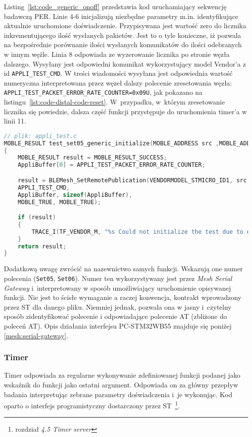 Listing~\ref{lst:code_generic_onoff} przedstawia kod uruchamiający sekwencję badawczą PER. Linie 4-6 inicjalizują niezbędne
parametry m.in. identyfikujące aktualnie uruchomione doświadczenie. Przypisywana jest wartość zero do licznika inkrementującego
ilość wysłanych pakietów. Jest to o tyle  konieczne, iż pozwala na bezpośrednie porównanie ilości wysłanych komunikatów do
ilości odebranych w innym węźle. Linia 8 odpowiada ze wyzerowanie licznika po stronie węzła dalszego. Wysyłany jest odpowiedni
komunikat wykorzystujący model Vendor'a z id \texttt{APPLI\_TEST\_CMD}. W treści wiadomości wysyłana jest odpowiednia wartość numeryczna
interpretowana przez węzeł dalszy polecenie zresetowania węzła: \texttt{APPLI\_TEST\_PACKET\_ERROR\_RATE\_COUNTER=0x09U}, jak
pokazano na listingu~\ref{lst:code-distal-code-reset}.
W~przypadku, w~którym zresetowanie licznika się powiedzie, dalsza część funkcji przystępuje do uruchomienia timer'a
w linii 11.

\begin{lstlisting}[language=C,
    caption={Kod resetujący wartość licznika w węźle dystalnym},
    label={lst:code-distal-code-reset}]
// plik: appli_test.c
MOBLE_RESULT test_set05_generic_initialize(MOBLE_ADDRESS src ,MOBLE_ADDRESS dst)
{
	MOBLE_RESULT result = MOBLE_RESULT_SUCCESS;
	AppliBuffer[0] = APPLI_TEST_PACKET_ERROR_RATE_COUNTER;

	result = BLEMesh_SetRemotePublication(VENDORMODEL_STMICRO_ID1, src,
	APPLI_TEST_CMD,
	AppliBuffer, sizeof(AppliBuffer),
	MOBLE_TRUE, MOBLE_TRUE);

	if (result)
	{
		TRACE_I(TF_VENDOR_M, "%s Could not initialize the test due to error code=%d \r\n", OP_NAME_SET05, result);
	}
	return result;
}
\end{lstlisting}

Dodatkową uwagę zwrócić na nazewnictwo samych funkcji. Wskazują one numer polecenia (\texttt{Set05}, \texttt{Set06}). Numer ten wykorzystywany
jest przez \textit{Mesh Serial Gateway} i~interpretowany w sposób umożliwiający uruchomienie opisywanej funkcji. 
Nie jest to ścisłe wymaganie a raczej konwencja, kontrakt wprowadzony przez ST dla danego pliku. Niemniej jednak, pozwala
ona w jasny i~czytelny sposób zidentyfikować polecenie i odpowiadające polecenie \gls{AT} (zbliżone do poleceń AT). Opis
działania interfejsu PC-STM32WB55 znajduje się poniżej \ref{mesh:serial-gateway}.

\subsubsection{Timer}
Timer odpowiada za regularne wykonywanie zdefiniowanej funkcji podanej jako wskaźnik do funkcji jako ostatni argument. Odpowiada
on za główny przepływ badania interpretując zebrane parametry doświadczenia i~je wykonując. Kod oparto o interfejs programistyczny
dostarczony przez ST~\cite{stmicroelectronics_an5289_2021}\footnote{rozdział \textit{4.5 Timer server}}.

